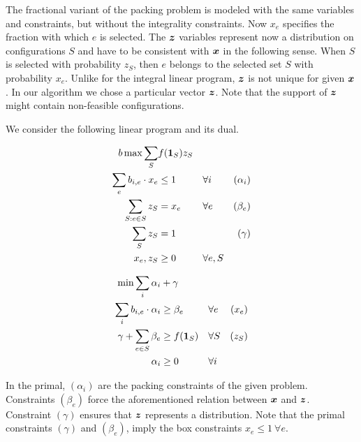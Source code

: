 The fractional variant of the packing problem is modeled with the same variables and constraints, but without the integrality constraints.  Now $x_e$ specifies the fraction with which $e$ is selected.  The $\bm{z}$ variables represent now a distribution on configurations $S$ and have to be consistent with $\bm{x}$ in the following sense. When $S$ is selected with probability $z_S$, then $e$ belongs to the selected set $S$ with probability $x_e$. Unlike for the integral linear program, $\bm{z}$ is not unique for given $\bm{x}$.  In our algorithm we chose a particular vector $\bm{z}$. Note that the support of $\bm{z}$ might contain non-feasible configurations.

We consider the following linear program and its  dual.  

\begin{minipage}[t]{0.45\textwidth}
\begin{align*}b
\max  \sum_{S} &f(\bm{1}_{S}) z_{S} \\
\sum_{e} b_{i,e}  \cdot x_{e}  &\leq 1 & &  \forall i & (\alpha_i)\\
\sum_{S: e \in S} z_{S}  &= x_{e} 	& & \forall e & (\beta_e)\\
\sum_{S} z_{S} &= 1 & & & (\gamma) \\
x_{e} , z_{S} &\geq 0 & & \forall e,S\\
\end{align*}
\end{minipage}
\quad
\begin{minipage}[t]{0.5\textwidth}
\begin{align*}
\min \sum_{i} \alpha_{i} &+ \gamma \\
\sum_{i} b_{i,e}  \cdot \alpha_{i} &\geq \beta_{e}  & &  \forall e & (x_e)\\
\gamma + \sum_{e \in S} \beta_{e} &\geq f(\bm{1}_{S})  & & \forall S & (z_S) \\
\alpha_{i} &\geq 0 & & \forall i 
\end{align*}
\end{minipage}

In the primal, $(\alpha_i)$ are the packing constraints of the given problem.  Constraints $(\beta_e)$ force the aforementioned  relation between $\bm{x}$ and $\bm{z}$.  Constraint $(\gamma)$ ensures that $\bm{z}$ represents a distribution.
Note that the primal constraints $(\gamma)$ and $(\beta_e)$, imply the box constraints $x_{e}  \leq 1 ~\forall e$. 
 
